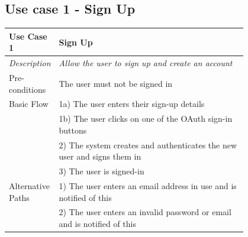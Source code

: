 \documentclass[12pt]{article}
\begin{document}
	\subsection{Use case 1 - Sign Up}
	\label{chap:use-cases-1}
	\begin{table}[H]
		\begin{tabular}{|l|p{0.8\linewidth}}
			\hline
			\rowcolor[HTML]{EFEFEF} 
			\textbf{Use Case 1}  & \textbf{Sign Up}                                                        \\ \hline
			\rowcolor[HTML]{F5FBFF} 
			\textit{Description} & \textit{Allow the user to sign up and create an account}                \\ \hline
			\rowcolor[HTML]{EFEFEF} 
			Pre-conditions       & The user must not be signed in                                          \\ \hline
			\rowcolor[HTML]{F5FBFF} 
			Basic Flow           & 1a) The user enters their sign-up details                               \\
			\rowcolor[HTML]{F5FBFF} 
			& 1b) The user clicks on one of the OAuth sign-in buttons                 \\
			\rowcolor[HTML]{F5FBFF} 
			& 2) The system creates and authenticates the new user and signs them in  \\
			\rowcolor[HTML]{F5FBFF} 
			& 3) The user is signed-in                                                \\ \hline
			\rowcolor[HTML]{EFEFEF} 
			Alternative Paths    & 1) The user enters an email address in use and is notified of this      \\
			\rowcolor[HTML]{EFEFEF} 
			& 2) The user enters an invalid password or email and is notified of this \\ \hline
		\end{tabular}
	\end{table}
\end{document}
